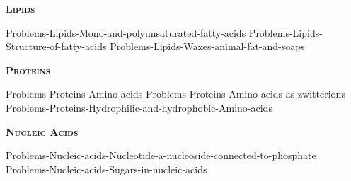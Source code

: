 \documentclass[main.tex]{subfiles}
\newcommand\chapterlabel{Ch-biochemistry}
\begin{document}
\begin{multicols*}{2}
{\raggedright\textsc{\textbf{Lipids}}\par}


 {Problems-Lipids-Mono-and-polyunsaturated-fatty-acids}
 {Problems-Lipids-Structure-of-fatty-acids}
 {Problems-Lipids-Waxes-animal-fat-and-soaps}


 





{\raggedright\textsc{\textbf{Proteins}}\par}




  {Problems-Proteins-Amino-acids}
 {Problems-Proteins-Amino-acids-as-zwitterions}
 {Problems-Proteins-Hydrophilic-and-hydrophobic-Amino-acids}





 

 

{\raggedright\textsc{\textbf{Nucleic Acids}}\par}


 {Problems-Nucleic-acids-Nucleotide-a-nucleoside-connected-to-phosphate}
 {Problems-Nucleic-acids-Sugars-in-nucleic-acids}
 
 


\end{multicols*} \iftoggle{showfinalanswers}{
\newpage\fancyhfoffset[E,O]{0pt}
\begin{answerbox}
\begin{answersenvironment}
 \begin{localsize}{10}
{ \checkoddpage\ifoddpage    \else   \clearpage\thispagestyle{empty}\mbox{}\clearpage\fi
\Large \bf Answers}
\SetupExSheets{ headings = inline-nr , counter-format = qu) ,}
\printsolutions 
  \vspace{20cm}
 \end{localsize}
 \end{answersenvironment}
\end{answerbox}
}{}
\checkoddpage\ifoddpage   \clearpage\thispagestyle{empty}\mbox{}\clearpage \else   \fi
\end{document}
